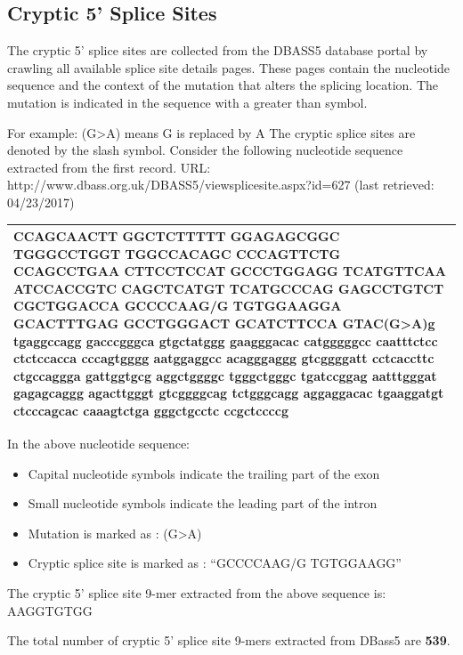 \documentclass[12pt,a4paper]{article}
\begin{document}
	\subsection{Cryptic 5' Splice Sites}
	
	The cryptic 5’ splice sites are collected from the DBASS5 database portal \cite{dbass-0, dbass3} by crawling all available splice site details pages. These pages contain the nucleotide sequence and the context of the mutation that alters the splicing location. The mutation is indicated in the sequence with a greater than symbol. \par
	For example: (G>A) means G is replaced by A \newline
	The cryptic splice sites are denoted by the slash symbol. \newline
	Consider the following nucleotide sequence extracted from the first record.\newline
	URL: http://www.dbass.org.uk/DBASS5/viewsplicesite.aspx?id=627 (last retrieved: 04/23/2017)
	\vspace{5mm}
		
	\begin{tabular}{ | p{\linewidth} |}
		\hline
		CCAGCAACTT GGCTCTTTTT GGAGAGCGGC TGGGCCTGGT TGGCCACAGC CCCAGTTCTG CCAGCCTGAA CTTCCTCCAT GCCCTGGAGG TCATGTTCAA ATCCACCGTC CAGCTCATGT TCATGCCCAG GAGCCTGTCT CGCTGGACCA GCCCCAA\textbf{G/G} TGTGGAAGGA GCACTTTGAG GCCTGGGACT GCATCTTCCA GTAC\textbf{(G>A)}g tgaggccagg gacccgggca gtgctatggg gaagggacac catgggggcc caatttctcc ctctccacca cccagtgggg aatggaggcc acagggaggg gtcggggatt cctcaccttc ctgccaggga gattggtgcg aggctggggc tgggctgggc tgatccggag aatttgggat gagagcaggg agacttgggt gtcggggcag tctgggcagg aggaggacac tgaaggatgt ctcccagcac caaagtctga gggctgcctc ccgctccccg \\
		\hline
	\end{tabular}
	\newline
	\newline
	In the above nucleotide sequence:
	\begin{itemize}
		\item Capital nucleotide symbols indicate the trailing part of the exon
		\item Small nucleotide symbols indicate the leading part of the intron
		\item Mutation is marked as : (G>A)
		\item Cryptic splice site is marked as : “GCCCCAAG/G TGTGGAAGG”
	\end{itemize}
	The cryptic 5’ splice site 9-mer extracted from the above sequence is: AAGGTGTGG \par
	The total number of cryptic 5’ splice site 9-mers extracted from DBass5 are \textbf{539}.
\end{document}
